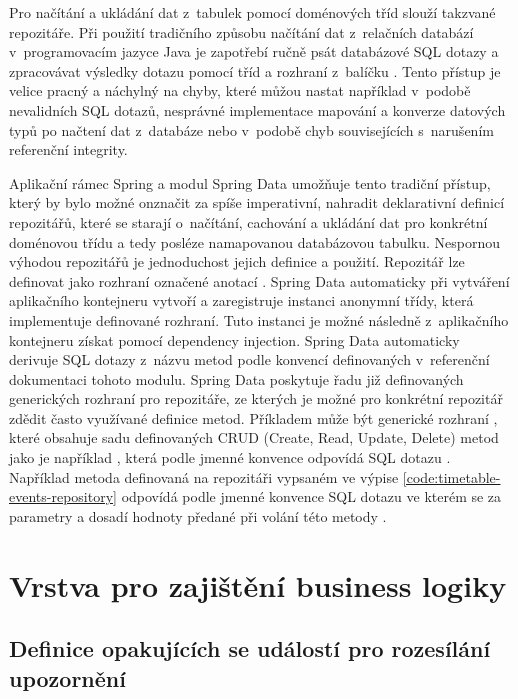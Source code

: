 Pro načítání a ukládání dat z~tabulek pomocí doménových tříd slouží takzvané repozitáře. Při použití tradičního způsobu načítání dat z~relačních databází v~programovacím jazyce Java je zapotřebí ručně psát databázové SQL dotazy a zpracovávat výsledky dotazu pomocí tříd a rozhraní z~balíčku . Tento přístup je velice pracný a náchylný na chyby, které můžou nastat například v~podobě nevalidních SQL dotazů, nesprávné implementace mapování a konverze datových typů po načtení dat z~databáze nebo v~podobě chyb souvisejících s~narušením referenční integrity. 

Aplikační rámec Spring a modul Spring Data umožňuje tento tradiční přístup, který by bylo možné onznačit za spíše imperativní, nahradit deklarativní definicí repozitářů, které se starají o~načítání, cachování a ukládání dat pro konkrétní doménovou třídu a tedy posléze namapovanou databázovou tabulku. Nespornou výhodou repozitářů je jednoduchost jejich definice a použití. Repozitář lze definovat jako rozhraní označené anotací . Spring Data automaticky při vytváření aplikačního kontejneru vytvoří a zaregistruje instanci anonymní třídy, která implementuje definované rozhraní. Tuto instanci je možné následně z~aplikačního kontejneru získat pomocí dependency injection. Spring Data automaticky derivuje SQL dotazy z~názvu metod podle konvencí definovaných v~referenční dokumentaci tohoto modulu. Spring Data poskytuje řadu již definovaných generických rozhraní pro repozitáře, ze kterých je možné pro konkrétní repozitář zdědit často využívané definice metod. Příkladem může být generické rozhraní , které obsahuje sadu definovaných CRUD (Create, Read, Update, Delete) metod jako je například , která podle jmenné konvence odpovídá SQL dotazu . Například metoda  definovaná na repozitáři  vypsaném ve výpise \ref{code:timetable-events-repository} odpovídá podle jmenné konvence SQL dotazu  ve kterém se za parametry  a  dosadí hodnoty předané při volání této metody \cite{spring_data}.

\section{Vrstva pro zajištění business logiky}

\subsection{Definice opakujících se událostí pro rozesílání upozornění}


